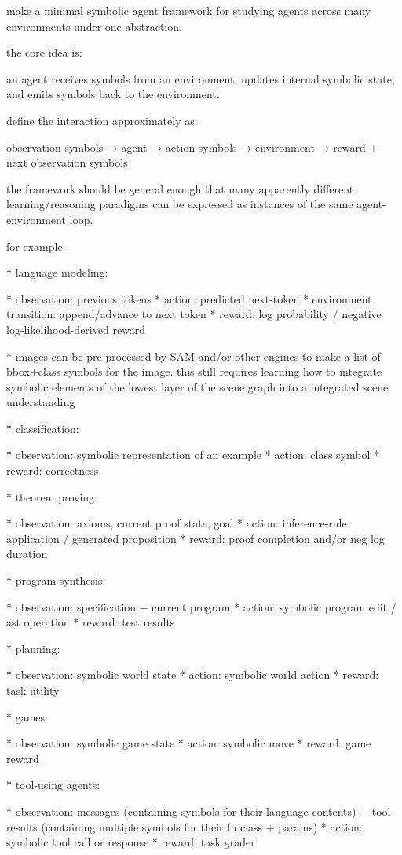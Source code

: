 make a minimal symbolic agent framework for studying agents across many environments under one abstraction.

the core idea is:

an agent receives symbols from an environment, updates internal symbolic state, and emits symbols back to the environment.

define the interaction approximately as:

observation symbols → agent → action symbols → environment → reward + next observation symbols

the framework should be general enough that many apparently different learning/reasoning paradigms can be expressed as instances of the same agent-environment loop.

for example:

* language modeling:

  * observation: previous tokens
  * action: predicted next-token
  * environment transition: append/advance to next token
  * reward: log probability / negative log-likelihood-derived reward

* images can be pre-processed by SAM and/or other engines to make a list of bbox+class symbols for the image. this still requires learning how to integrate symbolic elements of the lowest layer of the scene graph into a integrated scene understanding

* classification:

  * observation: symbolic representation of an example
  * action: class symbol
  * reward: correctness

* theorem proving:

  * observation: axioms, current proof state, goal
  * action: inference-rule application / generated proposition
  * reward: proof completion and/or neg log duration

* program synthesis:

  * observation: specification + current program
  * action: symbolic program edit / ast operation
  * reward: test results

* planning:

  * observation: symbolic world state
  * action: symbolic world action
  * reward: task utility

* games:

  * observation: symbolic game state
  * action: symbolic move
  * reward: game reward

* tool-using agents:

  * observation: messages (containing symbols for their language contents) + tool results (containing multiple symbols for their fn class + params)
  * action: symbolic tool call or response
  * reward: task grader

